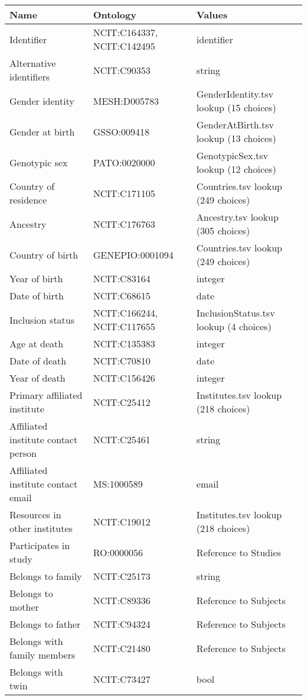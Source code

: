 \documentclass{article}
\begin{document}
\begin{table}[htb]
\begin{tabular}{lll}
Name & Ontology & Values \\
\hline
Identifier & NCIT:C164337, NCIT:C142495  & identifier \\
Alternative identifiers & NCIT:C90353  & string \\
Gender identity & MESH:D005783  & GenderIdentity.tsv lookup (15 choices) \\
Gender at birth & GSSO:009418  & GenderAtBirth.tsv lookup (13 choices) \\
Genotypic sex & PATO:0020000  & GenotypicSex.tsv lookup (12 choices) \\
Country of residence & NCIT:C171105  & Countries.tsv lookup (249 choices) \\
Ancestry & NCIT:C176763  & Ancestry.tsv lookup (305 choices) \\
Country of birth & GENEPIO:0001094  & Countries.tsv lookup (249 choices) \\
Year of birth & NCIT:C83164  & integer \\
Date of birth & NCIT:C68615  & date \\
Inclusion status & NCIT:C166244, NCIT:C117655  & InclusionStatus.tsv lookup (4 choices) \\
Age at death & NCIT:C135383  & integer \\
Date of death & NCIT:C70810  & date \\
Year of death & NCIT:C156426  & integer \\
Primary affiliated institute & NCIT:C25412  & Institutes.tsv lookup (218 choices) \\
Affiliated institute contact person & NCIT:C25461  & string \\
Affiliated institute contact email & MS:1000589  & email \\
Resources in other institutes & NCIT:C19012  & Institutes.tsv lookup (218 choices) \\
Participates in study & RO:0000056  & Reference to Studies \\
Belongs to family & NCIT:C25173  & string \\
Belongs to mother & NCIT:C89336  & Reference to Subjects \\
Belongs to father & NCIT:C94324  & Reference to Subjects \\
Belongs with family members & NCIT:C21480  & Reference to Subjects \\
Belongs with twin & NCIT:C73427  & bool \\

\end{tabular}
\end{table}
\end{document}
